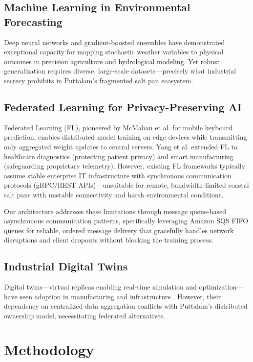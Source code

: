 \documentclass[conference]{IEEEtran}
\begin{document}
\subsection{Machine Learning in Environmental Forecasting}
Deep neural networks and gradient-boosted ensembles have demonstrated exceptional capacity for mapping stochastic weather variables to physical outcomes in precision agriculture \cite{yang2020healthcare} and hydrological modeling. Yet robust generalization requires diverse, large-scale datasets—precisely what industrial secrecy prohibits in Puttalam's fragmented salt pan ecosystem.

\subsection{Federated Learning for Privacy-Preserving AI}
Federated Learning (FL), pioneered by McMahan et al. \cite{mcmahan2017federated} for mobile keyboard prediction, enables distributed model training on edge devices while transmitting only aggregated weight updates to central servers. Yang et al. \cite{yang2020healthcare} extended FL to healthcare diagnostics (protecting patient privacy) and smart manufacturing (safeguarding proprietary telemetry). However, existing FL frameworks typically assume stable enterprise IT infrastructure with synchronous communication protocols (gRPC/REST APIs)—unsuitable for remote, bandwidth-limited coastal salt pans with unstable connectivity and harsh environmental conditions.

Our architecture addresses these limitations through message queue-based asynchronous communication patterns, specifically leveraging Amazon SQS FIFO queues for reliable, ordered message delivery that gracefully handles network disruptions and client dropouts without blocking the training process.

\subsection{Industrial Digital Twins}
Digital twins—virtual replicas enabling real-time simulation and optimization—have seen adoption in manufacturing and infrastructure \cite{tao2019digital}. However, their dependency on centralized data aggregation conflicts with Puttalam's distributed ownership model, necessitating federated alternatives.

\section{Methodology}
\end{document}
